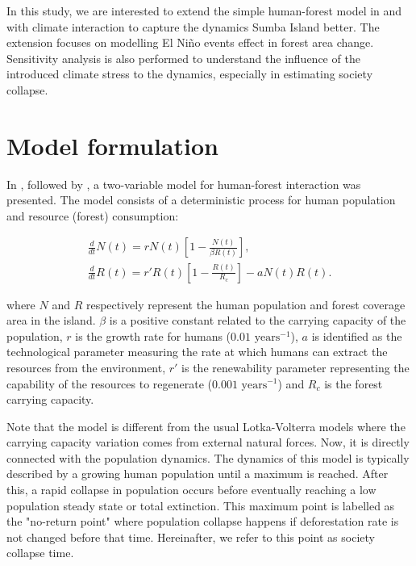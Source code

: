 \documentclass{style}
\begin{document}
In this study, we are interested to extend the simple human-forest model in \cite{bologna2008simple} and \cite{bologna2020deforestation} with climate interaction to capture the dynamics Sumba Island better. The extension focuses on modelling El Niño events effect in forest area change. Sensitivity analysis is also performed to understand the influence of the introduced climate stress to the dynamics, especially in estimating society collapse.

\section{Model formulation}
In \cite{bologna2008simple}, followed by \cite{bologna2020deforestation}, a two-variable model for human-forest interaction was presented. The model consists of a deterministic process for human population and resource (forest) consumption:

\begin{align}
    \frac{d}{dt} N(t) = r N(t) \left[ 1 - \frac{N(t)}{\beta R(t)} \right], \label{human_eq} \\
    \frac{d}{dt} R(t) = r' R(t) \left[ 1 - \frac{R(t)}{R_c} \right] - a N(t) R(t). \label{forest_eq_old}
\end{align}

where $N$ and $R$ respectively represent the human population and forest coverage area in the island. $\beta$ is a positive constant related to the carrying capacity of the population, $r$ is the growth rate for humans ($0.01 \text{ years}^{-1}$), $a$ is identified as the technological parameter measuring the rate at which humans can extract the resources from the environment, $r'$ is the renewability parameter representing the capability of the resources to regenerate ($0.001 \text{ years}^{-1}$) and $R_c$ is the forest carrying capacity.

Note that the model is different from the usual Lotka-Volterra models where the carrying capacity variation comes from external natural forces. Now, it is directly connected with the population dynamics. The dynamics of this model is typically described by a growing human population until a maximum is reached. After this, a rapid collapse in population occurs before eventually reaching a low population steady state or total extinction. This maximum point is labelled as the "no-return point" where population collapse happens if deforestation rate is not changed before that time. Hereinafter, we refer to this point as society collapse time.
\end{document}
